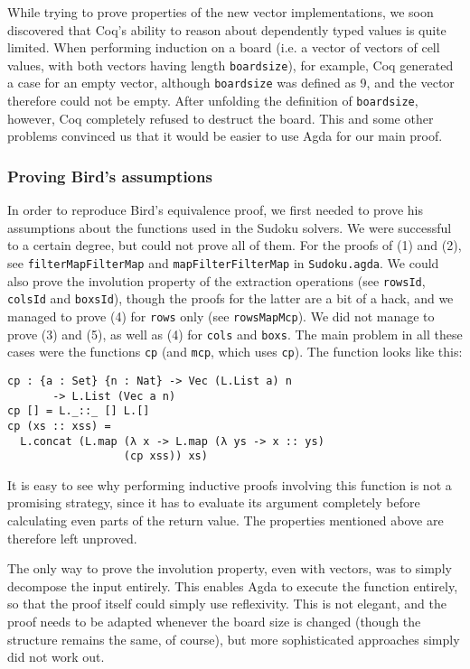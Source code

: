 \documentclass[a4paper,11pt]{article}
\begin{document}
While trying to prove properties of the new vector implementations, we soon discovered that Coq's ability to reason about dependently typed values is quite limited. When performing induction on a board (i.e. a vector of vectors of cell values, with both vectors having length \texttt{boardsize}), for example, Coq generated a case for an empty vector, although \texttt{boardsize} was defined as 9, and the vector therefore could not be empty. After unfolding the definition of \texttt{boardsize}, however, Coq completely refused to destruct the board. This and some other problems convinced us that it would be easier to use Agda for our main proof.

\subsubsection{Proving Bird's assumptions}
In order to reproduce Bird's equivalence proof, we first needed to prove his assumptions about the functions used in the Sudoku solvers. We were successful to a certain degree, but could not prove all of them. For the proofs of (1) and (2), see \texttt{filterMapFilterMap} and \texttt{mapFilterFilterMap} in \texttt{Sudoku.agda}. We could also prove the involution property of the extraction operations (see \texttt{rowsId}, \texttt{colsId} and \texttt{boxsId}), though the proofs for the latter are a bit of a hack, and we managed to prove (4) for \texttt{rows} only (see \texttt{rowsMapMcp}). We did not manage to prove (3) and (5), as well as (4) for \texttt{cols} and \texttt{boxs}. The main problem in all these cases were the functions \texttt{cp} (and \texttt{mcp}, which uses \texttt{cp}). The function looks like this:
\begin{lstlisting}
cp : {a : Set} {n : Nat} -> Vec (L.List a) n 
       -> L.List (Vec a n)
cp [] = L._::_ [] L.[]
cp (xs :: xss) = 
  L.concat (L.map (λ x -> L.map (λ ys -> x :: ys) 
                  (cp xss)) xs)
\end{lstlisting}

It is easy to see why performing inductive proofs involving this function is not a promising strategy, since it has to evaluate its argument completely before calculating even parts of the return value. The properties mentioned above are therefore left unproved.

The only way to prove the involution property, even with vectors, was to simply decompose the input entirely. This enables Agda to execute the function entirely, so that the proof itself could simply use reflexivity. This is not elegant, and the proof needs to be adapted whenever the board size is changed (though the structure remains the same, of course), but more sophisticated approaches simply did not work out.
\end{document}
